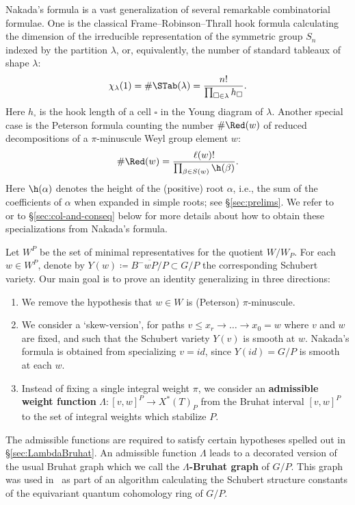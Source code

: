 Nakada's formula is a vast generalization of several remarkable combinatorial formulae. One is the classical 
Frame--Robinson--Thrall hook formula calculating the dimension of the 
irreducible representation of the symmetric group $S_n$ indexed by the partition $\lambda$, or, equivalently, 
the number of standard tableaux of shape $\lambda$:
\begin{equation*}\label{equ:hook}
	\chi_\lambda(1)=\#\STab(\lambda)= \frac{n!}{\prod_{\square\in \lambda}h_\square} \/.
\end{equation*}
Here $h_\square$ is the hook length of a cell $\square$ in the Young diagram of $\lambda$. 
Another special case is
the Peterson formula counting the number $\#\Red(w)$ of reduced decompositions of a 
$\pi$-minuscule Weyl group element $w$:
\begin{equation}\label{E:introredw} \#\Red(w)=\frac{\ell(w)!}{\prod_{\beta\in S(w)}\h(\beta)} \/. \end{equation}
Here $\h(\alpha)$ denotes the height of the (positive) root $\alpha$, i.e., the sum of the coefficients
	of $\alpha$ when expanded in simple roots; see \S\ref{sec:prelims}.
We refer to~\cite{nakada:colored} or to \S\ref{sec:col-and-conseq} below for more details about how to obtain these specializations from Nakada's formula. 

Let $W^P$ be the set of minimal representatives for the quotient $W/W_P$. 
For each $w \in W^P$, denote by 
$Y(w)\coloneqq \overline{B^-w P/P} \subset G/P$ the corresponding Schubert variety.  
Our main goal is to prove an identity generalizing  in three directions:
\begin{enumerate}
	\item We remove the hypothesis that $w \in W$ is (Peterson) $\pi$-minuscule.
	\item We consider a `skew-version', for paths $v \le x_r \to \ldots \to x_0 = w$ where $v$ and $w$ are fixed, and such that 
	the Schubert variety $Y(v)$ is smooth at $w$. Nakada's formula is obtained from specializing $v=id$, 
	since $Y(id) = G/P$ is smooth at each $w$.
	\item Instead of fixing a single integral weight $\pi$, we consider an {\bf admissible weight function}
	$\Lambda: [v,w]^P \to {X^*(T)_P}$ from the Bruhat interval $[v,w]^P$ to the set of integral weights which stabilize $P$.
\end{enumerate}
The admissible functions are required to satisfy certain hypotheses spelled out in \S\ref{sec:LambdaBruhat}. 
An admissible function $\Lambda$ leads to a 
decorated version of the usual Bruhat graph which we call the {\bf $\Lambda$-Bruhat graph} of $G/P$.
This graph was used in~\cite{mihalcea:eqqgr,mihalcea:eqqhom} as part of an algorithm calculating the Schubert structure constants of the equivariant quantum cohomology ring of $G/P$.

